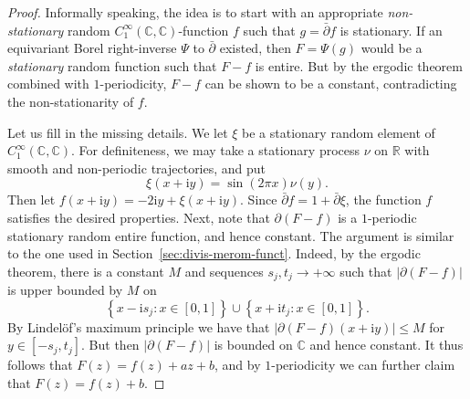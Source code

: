 \documentclass[12pt]{paper}
\numberwithin{equation}{section}
\theoremstyle{plain}
\theoremstyle{definition}
\newcommand{\C}{\mathbb{C}}
\newcommand{\R}{\mathbb{R}}
\newcommand{\im}{\mathrm{i}} %
\newcommand{\smooth}[2][]{C^{\infty}_{#1}(#2)}
\begin{document}
\begin{proof}
  Informally speaking, the idea is to start with an appropriate \emph{non-stationary} random
  \(\smooth[1]{\C,\C}\)-function \(f\) such that \(g=\bar\partial f\) is stationary.  If an
  equivariant Borel right-inverse \(\Psi\) to \(\bar\partial\) existed, then \(F=\Psi(g)\) would be
  a \emph{stationary} random function such that \(F-f\) is entire.  But by the ergodic theorem
  combined with \(1\)-periodicity, \(F-f\) can be shown to be a constant, contradicting the
  non-stationarity of \(f\).

  \medskip

  Let us fill in the missing details. We let \(\xi\) be a stationary random element of
  \(\smooth[1]{\C,\C}\). For definiteness, we may take a stationary process \(\nu\) on
  \(\R\) with smooth and non-periodic trajectories, and put
  \[ \xi(x+\im y)=\sin(2\pi x)\nu(y). \]
  Then let \(f(x+\im y)=-2\im y+ \xi(x+\im y)\).  Since \(\bar\partial f=1+\bar\partial \xi\), the
  function \(f\) satisfies the desired properties.  Next, note that \(\partial(F-f)\) is a
  \(1\)-periodic stationary random entire function, and hence constant. The argument is similar to
  the one used in Section~\ref{sec:divis-merom-funct}.  Indeed, by the ergodic theorem, there is a
  constant \(M\) and sequences \(s_j,t_j\to+\infty\) such that \(|\partial(F-f)|\) is upper bounded
  by \(M\) on
  \[
    \left\{x-\im s_j:x\in [0,1]\right\}\cup \left\{x+\im t_j:x\in [0,1]\right\}.
  \]
  By Lindelöf's maximum principle we have that \(|\partial(F-f)(x+\im y)|\le M\) for
  \(y\in [-s_j,t_j]\). But then \(|\partial (F-f)|\) is bounded on \(\C\) and hence
  constant. It thus follows that \(F(z)=f(z)+az+b\), and by \(1\)-periodicity we can further claim
  that \(F(z)=f(z)+b\).

  \medskip


\end{proof}
\end{document}

